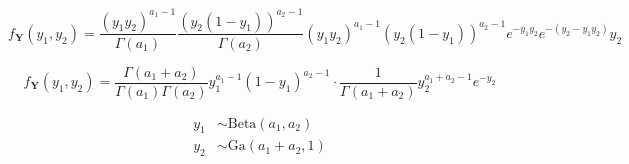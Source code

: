 \documentclass[12pt]{article}
\begin{document}
        \begin{equation}
              f_{\mathbf{Y}}(y_1, y_2) = \frac{(y_1 y_2)^{a_1-1}}{\Gamma(a_1)}\frac{(y_2 (1-y_1))^{a_2-1}}{\Gamma(a_2)}(y_1 y_2)^{a_1-1} (y_2 (1-y_1))^{a_2-1} e^{-y_1 y_2}e^{-(y_2 - y_1 y_2)} y_2
        \end{equation}

        \begin{equation}
              f_{\mathbf{Y}}(y_1, y_2) = \frac{\Gamma(a_1 + a_2)}{\Gamma(a_1) \Gamma(a_2)} y_1^{a_1 -1} (1-y_1)^{a_2 - 1} \cdot \frac{1}{\Gamma(a_1 + a_2)} y_2^{a_1 + a_2 -1} e^{-y_2}
        \end{equation}

        \begin{align}
              y_1 &\sim \text{Beta}(a_1, a_2)\\
              y_2 &\sim \text{Ga}(a_1 + a_2, 1)
        \end{align}
\end{document}
